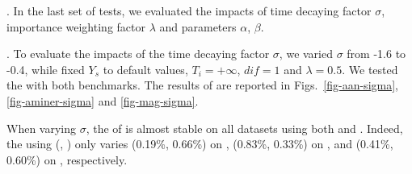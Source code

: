 

.
In the last set of tests, we evaluated the impacts of time decaying factor $\sigma$, importance weighting factor $\lambda$ and parameters $\alpha$, $\beta$.





.
To evaluate the impacts of the time decaying factor $\sigma$, we varied $\sigma$ from -1.6 to -0.4, while fixed $Y_s$ to default values, $T_i=+\infty$, $dif=1$ and $\lambda=0.5$. We tested the \PairAcc with both benchmarks. The results of \PairAcc are reported in Figs.~\ref{fig-aan-sigma}, \ref{fig-aminer-sigma} and \ref{fig-mag-sigma}.



When varying $\sigma$, the \PairAcc of \ensemblerank is almost stable on all datasets using both \fcita and \recom. Indeed, the \PairAcc using (\recom, \fcita) only varies (0.19\%, 0.66\%) on \aan, (0.83\%, 0.33\%) on \aminer, and (0.41\%, 0.60\%) on \magdata, respectively.

